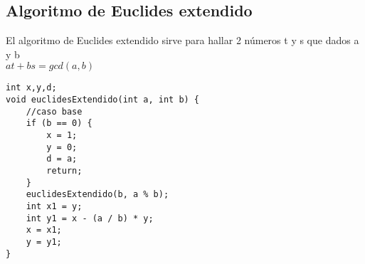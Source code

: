 \subsection{Algoritmo de Euclides extendido}
El algoritmo de Euclides extendido sirve para hallar 2 números t y s que dados a y b\\
$at+bs=gcd(a,b)$
\begin{lstlisting}[style=C,caption=euclidesExtendido.cpp]
int x,y,d;
void euclidesExtendido(int a, int b) {
    //caso base
	if (b == 0) {
        x = 1;
        y = 0;
        d = a;
        return;
    }
	euclidesExtendido(b, a % b);
	int x1 = y;
	int y1 = x - (a / b) * y;
	x = x1;
	y = y1;
}
\end{lstlisting}
